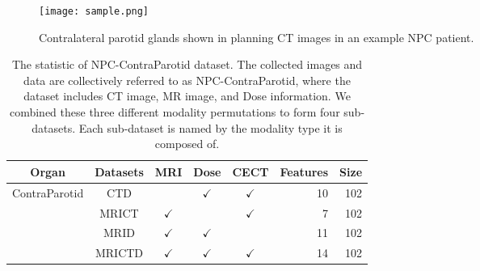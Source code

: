 \iffalse
This study presents a label-softening technique for multi-kernel mapping. By incorporating a non-negative label relaxation matrix following high-dimensional mapping, we transform the rigid binary label matrix into a more flexible slack variable matrix, thereby significantly curtailing the overfitting issue. This is accomplished via the construction of class compactness graphs (illustrated in Fig.\ref{angle}). Our proposed technique provides two primary benefits: firstly, it maximizes the margin between diverse classes to the greatest possible extent; secondly, it affords enhanced flexibility for superior label fitting. Through the application of a class compactness map, we ensure that samples from the same class maintain proximity in the transformed space, effectively mitigating overfitting. Extensive experimental trials corroborate the marked efficacy of our Multi-Kernel Fuzzy Label Softening (MK-FLS) approach.
\fi
\begin{figure}[ht]
  \centering              
    \texttt{[image: sample.png]}
    \caption{Contralateral parotid glands shown in planning CT images in an example NPC patient.}
    \label{organ}
    \vspace{-3mm}
\end{figure}

\begin{table*}[ht]
\centering
\caption{The statistic of NPC-ContraParotid dataset. The collected images and data are collectively referred to as NPC-ContraParotid, where the dataset includes CT image, MR image, and Dose information. We combined these three different modality permutations to form four sub-datasets. Each sub-dataset is named by the modality type it is composed of.}
\begin{tabular}{cccccrr}
\toprule[1pt]
Organ                         &Datasets&MRI&Dose&CECT&Features&Size\\ 
\hline
\multirow{4}{*}{ContraParotid}&CTD      &   &$\checkmark$&$\checkmark$&10&102\\
                              &MRICT      &$\checkmark$& &$\checkmark$&7&102\\
                              &MRID      &$\checkmark$&$\checkmark$& &11&102 \\
                              &MRICTD      &$\checkmark$&$\checkmark$&$\checkmark$&14&102\\
\toprule[1pt]
\end{tabular}
\label{statistic}
\end{table*}